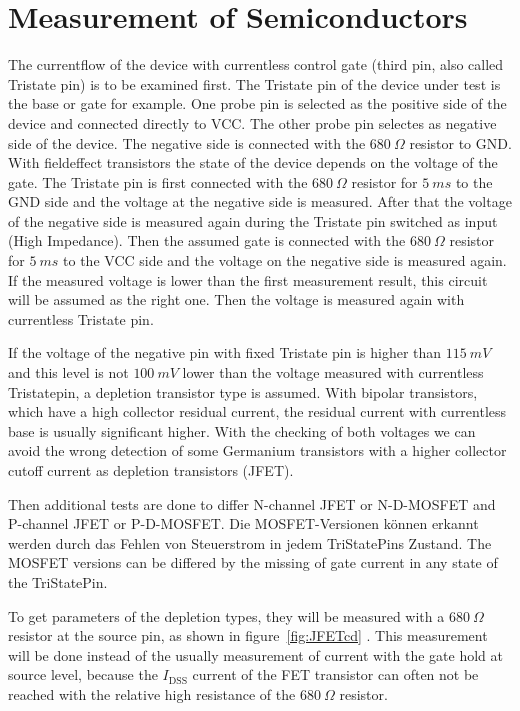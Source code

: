 	\section{Measurement of Semiconductors}
	The currentflow of the device with currentless control gate (third pin, also called Tristate pin)
is to be examined first.
The Tristate pin of the device under test is the base or gate for example.
One probe pin is selected as the positive side of the device and connected directly to VCC.
The other probe pin  selectes as negative side of the device.
The negative side is connected with the \(680~\Omega\) resistor to GND.
With fieldeffect transistors the state of the device depends on the voltage of the gate.
The Tristate pin is first connected with the \(680~\Omega\) resistor for \(5~ms\) to the GND side and
the voltage at the negative side is measured.
After that the voltage of the negative side is measured again during the Tristate pin switched
as input (High Impedance).
Then the assumed gate is connected with the \(680~\Omega\) resistor for \(5~ms\) to the VCC side and
the voltage on the negative side is measured again.
If the measured voltage is lower than the first measurement result, this circuit will
be assumed as the right one. Then the voltage is measured again with currentless Tristate pin.

If the voltage of the negative pin with fixed Tristate pin is higher than \(115~mV\) and
this level is not \(100~mV\) lower than the voltage measured with currentless Tristatepin,
a depletion transistor type is assumed.
With bipolar transistors, which have a high collector residual current,
the residual current with currentless base is usually significant higher.
With the checking of both voltages we can avoid the wrong detection of some Germanium transistors with a higher
collector cutoff current as depletion transistors (JFET).

Then additional tests are done 
to differ N-channel JFET or N-D-MOSFET and P-channel JFET or P-D-MOSFET.
Die MOSFET-Versionen können erkannt werden durch das Fehlen von Steuerstrom in jedem
TriStatePins Zustand.
The MOSFET versions can be differed by the missing of gate current in any state
of the TriStatePin.

To get parameters of the depletion types, they will be measured with a \(680~\Omega\) resistor at
the source pin, as shown in figure~\ref{fig:JFETcd} . This measurement will be done instead of the
usually measurement of current with the gate hold at source level, because
the \(I_\mathrm{DSS}\) current of the FET transistor can often not be reached
with the relative high resistance of the \(680~\Omega\) resistor.

